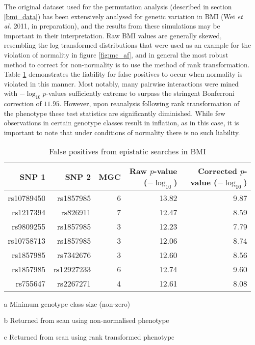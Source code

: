 The original dataset used for the permutation analysis (described in section \ref{bmi_data}) has been extensively analysed for genetic variation in BMI (Wei \emph{et al.} 2011, in preparation), and the results from these simulations may be important in their interpretation. Raw BMI values are generally skewed, resembling the log transformed distributions that were used as an example for the violation of normality in figure \ref{fig:mc_af}, and in general the most robust method to correct for non-normality is to use the method of rank transformation. Table \ref{tab:bmi_results} demonstrates the liability for false positives to occur when normality is violated in this manner. Most notably, many pairwise interactions were mined with $- \log_{10}p$-values sufficiently extreme to surpass the stringent Bonferroni correction of $11.95$. However, upon reanalysis following rank transformation of the phenotype these test statistics are significantly diminished. While few observations in certain genotype classes result in inflation, as in this case, it is important to note that under conditions of normality there is no such liability.

\begin{table}
  \begin{center}
  \begin{threeparttable}
  \caption{\label{tab:bmi_results}False positives from epistatic searches in BMI}
    \begin{tabular}{rrrrr}
    \toprule
SNP 1 & SNP 2 & MGC \tnote{a} & Raw $p$-value ($-\log_{10}$) \tnote{b} & Corrected $p$-value ($-\log_{10}$) \tnote{c} \\
\midrule
rs10789450 & rs1857985 & 6 & 13.82 & 9.87 \\
rs1217394 & rs826911 & 7 & 12.47 & 8.59 \\
rs9809255 & rs1857985 & 3 & 12.23 & 7.79 \\
rs10758713 & rs1857985 & 3 & 12.06 & 8.74 \\
rs1857985 & rs7342676 & 3 & 12.60 & 8.56 \\
rs1857985 & rs12927233 & 6 & 12.74 & 9.60 \\
rs755647 & rs2267271 & 4 & 12.61 & 8.08 \\
\bottomrule
\end{tabular}
\begin{tablenotes}{\footnotesize
\item[a] Minimum genotype class size (non-zero)
\item[b] Returned from scan using non-normalised phenotype
\item[c] Returned from scan using rank transformed phenotype}
\end{tablenotes}
\end{threeparttable}
\end{center}
\end{table}


